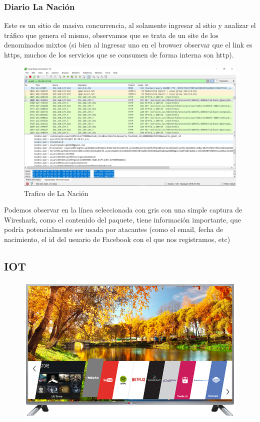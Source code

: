 \documentclass[10pt,a4paper]{article}
\begin{document}
\subsubsection{Diario La Nación}
Este es un sitio de masiva concurrencia, al solamente ingresar al sitio y analizar el tráfico que genera el mismo, observamos que se trata de un site de los denominados mixtos (si bien al ingresar uno en el browser observar que el link es https, muchos de los servicios que se consumen de forma interna son http).

\begin{figure}[H]
\centerline{\includegraphics[scale=0.2]{images/lanacion.jpg}}
\caption{Trafico de La Nación}
\end{figure}

Podemos observar en la línea seleccionada con gris con una simple captura de Wireshark, como el contenido del paquete, tiene información importante, que podría potencialmente ser usada por atacantes (como el email, fecha de nacimiento, el id del usuario de Facebook con el que nos registramos, etc)

\pagebreak

\subsection{IOT}

\begin{figure}[H]
\centerline{\includegraphics[scale=0.33]{images/LG_LB6500.jpg}}
\caption{}
\end{figure}
\end{document}
